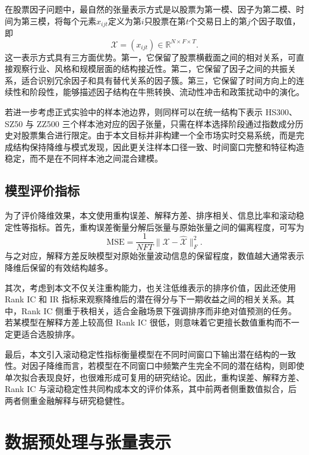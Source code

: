 在股票因子问题中，最自然的张量表示方式是以股票为第一模、因子为第二模、时间为第三模，将每个元素$x_{ijt}$定义为第$i$只股票在第$t$个交易日上的第$j$个因子取值，即
\begin{equation}
\mathcal{X}=(x_{ijt})\in\mathbb{R}^{N\times F\times T}.
\end{equation}
这一表示方式具有三方面优势。第一，它保留了股票横截面之间的相对关系，可直接观察行业、风格和规模层面的结构接近性。第二，它保留了因子之间的共振关系，适合识别冗余因子和具有替代关系的因子簇。第三，它保留了时间方向上的连续性和阶段性，能够描述因子结构在牛熊转换、流动性冲击和政策扰动中的演化。

若进一步考虑正式实验中的样本池边界，则同样可以在统一结构下表示 HS300、SZ50 与 ZZ500 三个样本池对应的因子张量，只需在样本选择阶段通过指数成分历史对股票集合进行限定。由于本文目标并非构建一个全市场实时交易系统，而是完成结构保持降维与模式发现，因此更关注样本口径一致、时间窗口完整和特征构造稳定，而不是在不同样本池之间混合建模。

\section{模型评价指标}

为了评价降维效果，本文使用重构误差、解释方差、排序相关、信息比率和滚动稳定性等指标。首先，重构误差衡量分解后张量与原始张量之间的偏离程度，可写为
\begin{equation}
\mathrm{MSE}=\frac{1}{NFT}\|\mathcal{X}-\hat{\mathcal{X}}\|_F^2.
\end{equation}
与之对应，解释方差反映模型对原始张量波动信息的保留程度，数值越大通常表示降维后保留的有效结构越多。

其次，考虑到本文不仅关注重构能力，也关注低维表示的排序价值，因此还使用 Rank IC 和 IR 指标来观察降维后的潜在得分与下一期收益之间的相关关系。其中，Rank IC 侧重于秩相关，适合金融场景下强调排序而非绝对值预测的任务。若某模型在解释方差上较高但 Rank IC 很低，则意味着它更擅长数值重构而不一定更适合选股排序。

最后，本文引入滚动稳定性指标衡量模型在不同时间窗口下输出潜在结构的一致性。对因子降维而言，若模型在不同窗口中频繁产生完全不同的潜在结构，则即使单次拟合表现良好，也很难形成可复用的研究结论。因此，重构误差、解释方差、Rank IC 与滚动稳定性共同构成本文的评价体系，其中前两者侧重数值拟合，后两者侧重金融解释与研究稳健性。

\chapter{数据预处理与张量表示}

